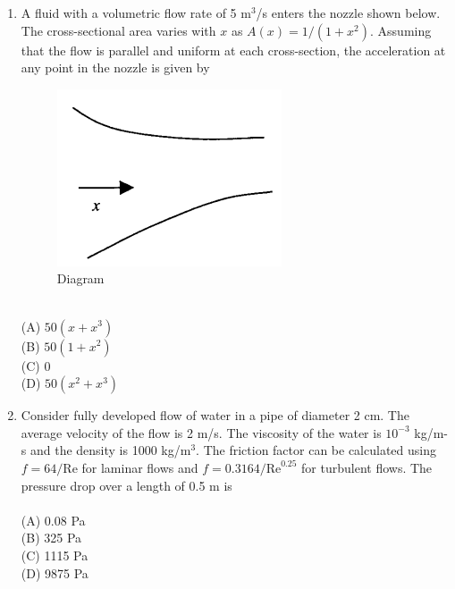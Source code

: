 \documentclass[journal,12pt,onecolumn]{IEEEtran}
\begin{document}
\begin{enumerate}
\newpage

\item A fluid with a volumetric flow rate of 5 m$^3$/s enters the nozzle shown below. The cross-sectional area varies with $x$ as $A(x) = 1/(1+x^2)$. Assuming that the flow is parallel and uniform at each cross-section, the acceleration at any point in the nozzle is given by\\

\begin{figure}[htbp]
  \centering
  \includegraphics[width=.65\linewidth]{figs/B/fig3.png}
  \caption{Diagram}
  \label{B/fig3}
\end{figure}
\vspace{0.2cm}
\hfill{} \\

(A) $50(x + x^3)$\\
(B) $50(1 + x^2)$\\
(C) $0$\\
(D) $50(x^2 + x^3)$
\vspace{0.5cm}

\item Consider fully developed flow of water in a pipe of diameter 2 cm. The average velocity of the flow is 2 m/s. The viscosity of the water is $10^{-3}$ kg/m-s and the density is 1000 kg/m$^3$. The friction factor can be calculated using $f = 64/\mathrm{Re}$ for laminar flows and $f = 0.3164/\mathrm{Re}^{0.25}$ for turbulent flows. The pressure drop over a length of 0.5 m is\\
\vspace{0.2cm}
\hfill{} \\
(A) 0.08 Pa\\
(B) 325 Pa\\
(C) 1115 Pa\\
(D) 9875 Pa
\vspace{0.5cm}


\end{enumerate}
\end{document}
